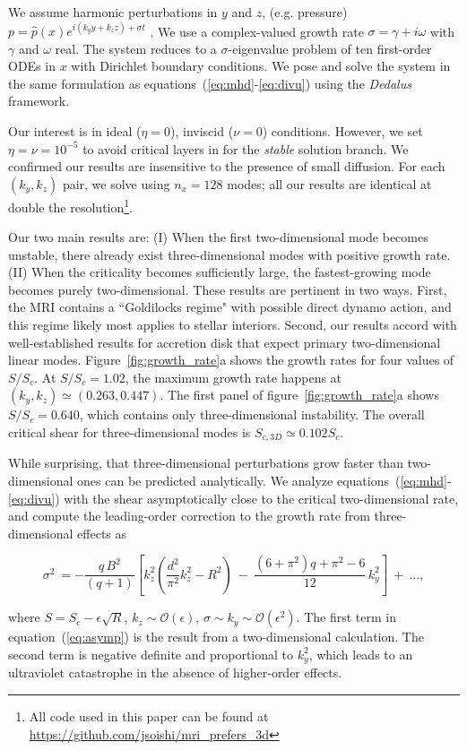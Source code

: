 \documentclass[aps,prl,reprint,superscriptaddress]{revtex4-1}
\newcommand{\SSC}{S/S_{c}}
\begin{document}
We assume harmonic perturbations in $y$ and $z$, (e.g. pressure) $p = \hat{p}(x) e^{i(k_y y + k_z z) + \sigma t}$ . We use a complex-valued growth rate $\sigma = \gamma + i\omega$ with $\gamma$ and $\omega$ real. 
The system reduces to a $\sigma$-eigenvalue problem of ten first-order ODEs in $x$ with Dirichlet boundary conditions.
We pose and solve the system in the same formulation as equations~(\ref{eq:mhd}-\ref{eq:divu}) using the \emph{Dedalus} framework. 

Our interest is in ideal ($\eta = 0$), inviscid ($\nu = 0$) conditions.
However, we set $\eta=\nu=10^{-5}$ to avoid critical layers in for the \textit{stable} solution branch.
We confirmed our results are insensitive to the presence of small diffusion. 
For each $(k_y, k_z)$ pair, we solve using $n_x = 128$ modes; all our results are identical at double the resolution\footnote{All code used in this paper can be found at \protect\url{https://github.com/jsoishi/mri\_prefers\_3d}}.

Our two main results are: (I) When the first two-dimensional mode becomes unstable, there already exist three-dimensional modes with positive growth rate. (II) When the criticality becomes sufficiently large, the fastest-growing mode becomes purely two-dimensional. These results are pertinent in two ways. First, the MRI contains a ``Goldilocks regime" with possible direct dynamo action, and this regime likely most applies to stellar interiors. Second, our results accord with well-established results for accretion disk that expect primary two-dimensional linear modes.
Figure~\ref{fig:growth_rate}a shows the growth rates for four values of $\SSC$. 
At $\SSC = 1.02$, the maximum growth rate happens at $(k_y, k_z) \simeq (0.263, 0.447)$.
The first panel of figure~\ref{fig:growth_rate}a shows $\SSC = 0.640$, which contains only three-dimensional instability.
The overall critical shear for three-dimensional modes is $S_{c,3D} \simeq 0.
102 S_c$.

While surprising, that three-dimensional perturbations grow faster than two-dimensional ones can be predicted analytically.
We analyze equations~(\ref{eq:mhd}-\ref{eq:divu}) with the shear asymptotically close to the critical two-dimensional rate,  and compute the leading-order correction to the growth rate from three-dimensional effects as
\begin{widetext}
\begin{equation}
  \label{eq:asymp}
\sigma^{2} \ = -\frac{q\,B^{2}}{(q+1)} \left[ k_z^2 \left(\frac{d^2}{\pi^{2}} k_z^2-R^{2}\right) \ - \ \frac{\left(6+\pi ^2\right) q+\pi
   ^2-6}{12 } \, k_{y}^{2}  \right] \ + \  \ldots,
\end{equation}
\end{widetext}
where $S = S_c - \epsilon \sqrt{R}$, $k_{z} \sim \mathcal{O}(\epsilon)$, $\sigma \sim k_{y} \sim \mathcal{O}(\epsilon^{2})$.
The first term in equation~(\ref{eq:asymp}) is the result from a two-dimensional calculation.
The second term is negative definite and proportional to $k_{y}^2$, which leads to an ultraviolet catastrophe in the absence of higher-order effects.
\end{document}
